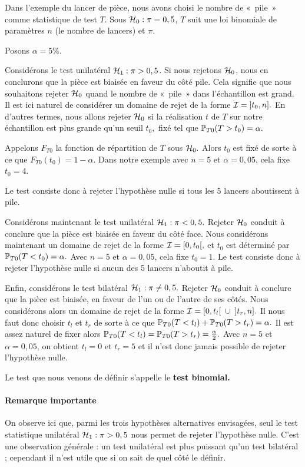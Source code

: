 \begin{exemple}
  Dans l'exemple du lancer de pièce, nous avons choisi le nombre de «~pile~» comme
  statistique de test $T$. Sous $\mathcal{H}_0 : \pi = 0,5$, $T$ suit une loi binomiale
  de paramètres $n$ (le nombre de lancers) et $\pi$.

  Posons $\alpha = 5\%.$

  Considérons le test unilatéral $\mathcal{H}_1 : \pi > 0,5$. Si nous rejetons $\mathcal{H}_0$,
  nous en conclurons que la pièce est biaisée en faveur du côté pile. Cela
  signifie que nous souhaitons rejeter $\mathcal{H}_0$ quand le nombre de «~pile~» dans
  l'échantillon est grand. Il est ici naturel de considérer un domaine de rejet
  de la forme $\mathcal{I} = \mathopen]t_0, n\mathclose].$ En d'autres termes, nous
  allons rejeter $\mathcal{H}_0$ si la réalisation $t$ de $T$ sur notre échantillon est
  plus grande qu'un seuil $t_0,$ fixé tel que $\mathbb{P}_{T0}(T > t_0) = \alpha.$

  Appelons $F_{T0}$ la fonction de répartition de $T$ sous $\mathcal{H}_0.$ Alors $t_0$
  est fixé de sorte à ce que $F_{T0}(t_0) = 1-\alpha$. Dans notre exemple avec
  $n=5$ et $\alpha=0,05$, cela fixe $t_0 = 4.$

  Le test consiste donc à rejeter l'hypothèse nulle si tous les 5 lancers
  aboutissent à pile.

  Considérons maintenant le test unilatéral $\mathcal{H}_1 : \pi < 0,5.$ Rejeter
  $\mathcal{H}_0$ conduit à conclure que la pièce est biaisée en faveur du côté
  face. Nous considérons maintenant un domaine de rejet de la forme
  $\mathcal{I} = \mathopen[0, t_0 \mathclose[,$ et $t_0$ est déterminé par
  $\mathbb{P}_{T0}(T < t_0) = \alpha.$ Avec $n=5$ et $\alpha=0,05$, cela fixe
  $t_0=1$. Le test consiste donc à rejeter l'hypothèse nulle si aucun des 5
  lancers n'aboutit à pile.

  Enfin, considérons le test bilatéral $\mathcal{H}_1 : \pi \neq 0,5.$ Rejeter $\mathcal{H}_0$
  conduit à conclure que la pièce est biaisée, en faveur de l'un ou de l'autre
  de ses côtés. Nous considérons alors un domaine de rejet de la forme
  $\mathcal{I} = \mathopen[0, t_l \mathclose[ \; \cup \; \mathopen]t_r, n
  \mathclose].$
  Il nous faut donc choisir $t_l$ et $t_r$ de sorte à ce que
  $\mathbb{P}_{T0}(T < t_l) + \mathbb{P}_{T0}(T > t_r) = \alpha.$ Il est assez naturel de
  fixer alors $\mathbb{P}_{T0}(T < t_l) = \mathbb{P}_{T0}(T > t_r) = \frac{\alpha}{2}.$ Avec
  $n=5$ et $\alpha=0,05$, on obtient $t_l = 0$ et $t_r = 5$ et il n'est donc
  jamais possible de rejeter l'hypothèse nulle.

  Le test que nous venons de définir s'appelle le \textbf{test binomial.}

  \paragraph{Remarque importante} On observe ici que, parmi les trois
  hypothèses alternatives envisagées, seul le test statistique unilatéral
  $\mathcal{H}_1: \pi > 0,5$ nous permet de rejeter l'hypothèse nulle. C'est une
  observation générale : un test unilatéral est plus puissant qu'un test
  bilatéral ; cependant il n'est utile que si on sait de quel côté le définir.
\end{exemple}

